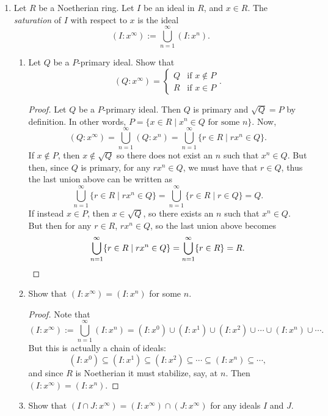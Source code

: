 \documentclass[11pt,oneside,english]{amsart}
\theoremstyle{definition}
\begin{document}
\begin{enumerate}[leftmargin=*]
\pagebreak

\item Let $R$ be a Noetherian ring. Let $I$ be an ideal in $R$, and $x \in R$. The \textit{saturation} of $I$ with respect to $x$ is the ideal
\[
(I : x^\infty) := \bigcup_{n=1}^\infty (I : x^n).
\]
\begin{enumerate}
\item Let $Q$ be a $P$-primary ideal. Show that
\[
(Q : x^\infty) = \left\lbrace \begin{array}{ll} Q & \text{if } x \notin P \\ R & \text{if } x \in P \end{array}\right..
\]

\begin{proof}
Let $Q$ be a $P$-primary ideal. Then $Q$ is primary and $\sqrt{Q}=P$ by definition. In other words, $P=\{x\in R\mid x^n\in Q\text{ for some }n\}$. Now,
\[
(Q:x^\infty)=\bigcup_{n=1}^\infty (Q : x^n)=\bigcup_{n=1}^\infty \{r\in R\mid rx^n\in Q\}.
\]
If $x\notin P$, then $x\notin\sqrt{Q}$ so there does not exist an $n$ such that $x^n\in Q$. But then, since $Q$ is primary, for any $rx^n\in Q$, we must have that $r\in Q$, thus the last union above can be written as
\[
\bigcup_{n=1}^\infty \{r\in R\mid rx^n\in Q\}=\bigcup_{n=1}^\infty \{r\in R\mid r\in Q\}=Q.
\]
If instead $x\in P$, then $x\in \sqrt{Q}$, so there exists an $n$ such that $x^n\in Q$. But then for any $r\in R$, $rx^n\in Q$, so the last union above becomes
\[
\bigcup_{n=1}^\infty \{r\in R\mid rx^n\in Q\}=\bigcup_{n=1}^\infty \{r\in R\}=R.\qedhere
\]
\end{proof}



\item Show that $(I : x^\infty) = (I : x^n)$ for some $n$.

\begin{proof}
Note that
\[
(I : x^\infty) := \bigcup_{n=1}^\infty (I : x^n)=(I:x^0)\cup(I:x^1)\cup(I:x^2)\cup\cdots\cup(I:x^n)\cup\cdots.
\]
But this is actually a chain of ideals:
\[
(I:x^0)\subseteq(I:x^1)\subseteq(I:x^2)\subseteq\cdots\subseteq(I:x^n)\subseteq\cdots,
\]
and since $R$ is Noetherian it must stabilize, say, at $n$. Then $(I : x^\infty) = (I : x^n)$.
\end{proof}


\pagebreak
\item Show that $(I \cap J : x^\infty) = (I : x^\infty) \cap (J : x^\infty)$ for any ideals $I$ and $J$.


\end{enumerate}
\end{enumerate}
\end{document}
